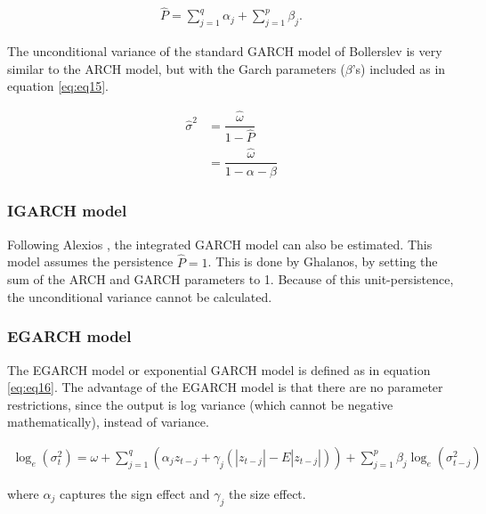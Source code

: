 \documentclass[a4paper, twoside]{templates/ociamthesis}
\begin{document}
\begin{align}
\hat{P} = \sum\limits_{j = 1}^q {{\alpha_j}}  + \sum\limits_{j = 1}^p {{\beta_j}}.
 \label{eq:eq14}
\end{align}

\noindent The unconditional variance of the standard GARCH model of Bollerslev is very similar to the ARCH model, but with the Garch parameters (\(\beta\)'s) included as in equation \eqref{eq:eq15}.

\begin{equation}
\begin{split}
\hat{\sigma}^2 
&= \dfrac{\hat{\omega}}{1 - \hat{P}} \\
&= \dfrac{\hat{\omega}}{1 - \alpha - \beta}
\end{split}
 \label{eq:eq15}
\end{equation}

\hypertarget{igarch-model}{%
\subsubsection{IGARCH model}\label{igarch-model}}

\noindent Following Alexios \textcite{ghalanos2020}, the integrated GARCH model \autocite{bollerslev1986} can also be estimated. This model assumes the persistence \(\hat{P} = 1\). This is done by Ghalanos, by setting the sum of the ARCH and GARCH parameters to 1. Because of this unit-persistence, the unconditional variance cannot be calculated.

\newpage

\hypertarget{egarch-model}{%
\subsubsection{EGARCH model}\label{egarch-model}}

\noindent The EGARCH model or exponential GARCH model \autocite{nelson1991} is defined as in equation \eqref{eq:eq16}. The advantage of the EGARCH model is that there are no parameter restrictions, since the output is log variance (which cannot be negative mathematically), instead of variance.

\begin{align}
\log_e(\sigma_t^2) = \omega + \sum\limits_{j=1}^q (\alpha_j z_{t-j} + \gamma_j (|z_{t-j}| - E|z_{t-j}|))+ \sum\limits_{j = 1}^p \beta_j \log_e(\sigma_{t-j}^2)
 \label{eq:eq16}
\end{align}

\noindent where \(\alpha_j\) captures the sign effect and \(\gamma_j\) the size effect.
\end{document}

